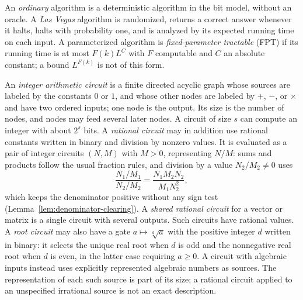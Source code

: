 An \emph{ordinary} algorithm is a deterministic algorithm in the bit model,
without an oracle. A \emph{Las Vegas} algorithm is randomized, returns a
correct answer whenever it halts, halts with probability one, and is
analyzed by its expected running time on each input. A parameterized
algorithm is \emph{fixed-parameter tractable} (FPT) if its running time is
at most $F(k)L^C$ with $F$ computable and $C$ an absolute constant; a bound
$L^{F(k)}$ is not of this form.

\begin{definition}
\label{def:models-circuits}
An \emph{integer arithmetic circuit} is a finite directed acyclic graph
whose sources are labeled by the constants $0$ or $1$, and whose other nodes
are labeled by $+$, $-$, or $\times$ and have two ordered inputs; one node is
the output. Its size is the number of nodes, and nodes may feed several later
nodes. A circuit of size $s$ can compute an integer with about $2^s$ bits. A
\emph{rational circuit} may in addition use rational constants written in
binary and division by nonzero values. It is evaluated as a pair of integer
circuits $(N,M)$ with $M>0$, representing $N/M$: sums and products follow the
usual fraction rules, and division by a value $N_2/M_2\ne0$ uses
\[
\frac{N_1/M_1}{N_2/M_2}=\frac{N_1M_2N_2}{M_1N_2^2},
\]
which keeps the denominator positive without any sign test
(Lemma~\ref{lem:denominator-clearing}). A \emph{shared rational circuit} for
a vector or matrix is a single circuit with several outputs. Such circuits
have rational values. A \emph{root circuit} may also have a gate
$a\mapsto\sqrt[d]{a}$ with the positive integer $d$ written in binary: it
selects the unique real root when $d$ is odd and the nonnegative real root
when $d$ is even, in the latter case requiring $a\ge0$. A circuit with
algebraic inputs instead uses explicitly represented algebraic numbers as
sources. The representation of each such source is part of its size; a
rational circuit applied to an unspecified irrational source is not an exact
description.
\end{definition}

